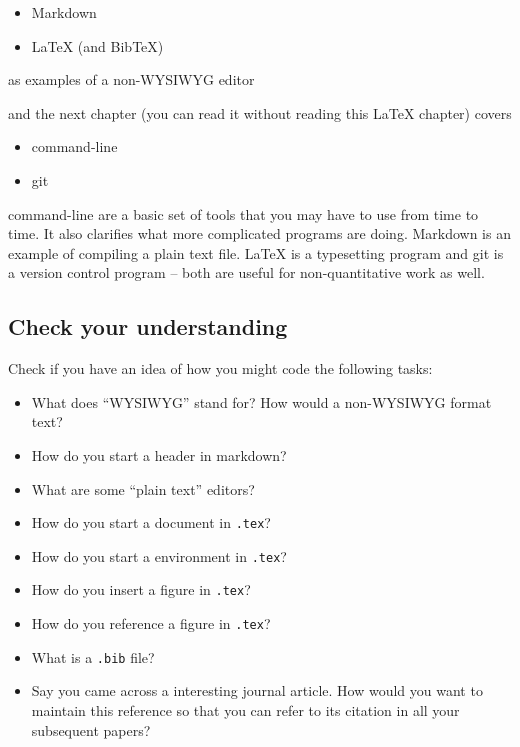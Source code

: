 \documentclass[]{book}
\providecommand{\tightlist}{%
  \setlength{\itemsep}{0pt}\setlength{\parskip}{0pt}}
\theoremstyle{definition}
\theoremstyle{definition}
\theoremstyle{definition}
\theoremstyle{remark}
\begin{document}
\begin{itemize}
\tightlist
\item
  Markdown
\item
  LaTeX (and BibTeX)
\end{itemize}

as examples of a non-WYSIWYG editor

and the next chapter (you can read it without reading this LaTeX
chapter) covers

\begin{itemize}
\tightlist
\item
  command-line
\item
  git
\end{itemize}

command-line are a basic set of tools that you may have to use from time
to time. It also clarifies what more complicated programs are doing.
Markdown is an example of compiling a plain text file. LaTeX is a
typesetting program and git is a version control program -- both are
useful for non-quantitative work as well.

\subsection*{Check your understanding}\label{check-your-understanding-3}

Check if you have an idea of how you might code the following tasks:

\begin{itemize}
\tightlist
\item
  What does ``WYSIWYG'' stand for? How would a non-WYSIWYG format text?
\item
  How do you start a header in markdown?
\item
  What are some ``plain text'' editors?
\item
  How do you start a document in \texttt{.tex}?
\item
  How do you start a environment in \texttt{.tex}?
\item
  How do you insert a figure in \texttt{.tex}?
\item
  How do you reference a figure in \texttt{.tex}?
\item
  What is a \texttt{.bib} file?
\item
  Say you came across a interesting journal article. How would you want
  to maintain this reference so that you can refer to its citation in
  all your subsequent papers?
\end{itemize}
\end{document}
